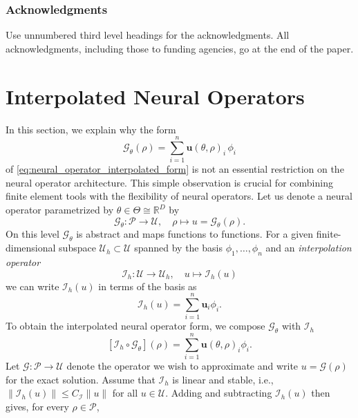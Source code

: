 \documentclass{article} %
\begin{document}
\subsubsection*{Acknowledgments}
Use unnumbered third level headings for the acknowledgments. All
acknowledgments, including those to funding agencies, go at the end of the paper.





\appendix

\section{Interpolated Neural Operators}
In this section, we explain why the form
\begin{equation*}
   \mathcal G_\theta(\rho) 
   =
   \sum_{i=1}^n\mathbf u(\theta, \rho)_i\,\phi_i
\end{equation*}
of \eqref{eq:neural_operator_interpolated_form} is not an essential restriction on the neural operator architecture. This simple observation is crucial for combining finite element tools with the flexibility of neural operators. Let us denote a neural operator parametrized by $\theta\in\Theta\cong \mathbb R^D$ by
\begin{equation*}
   \mathcal G_\theta:\mathcal P \to \mathcal U, \quad \rho \mapsto u = \mathcal G_\theta(\rho).
\end{equation*}
On this level $\mathcal G_\theta$ is abstract and maps functions to functions. For a given finite-dimensional subspace $\mathcal U_h\subset \mathcal U$ spanned by the basis $\phi_1,\dots,\phi_n$ and an \emph{interpolation operator}
\begin{equation*}
   \mathcal I_h : \mathcal U \to \mathcal U_h, \quad u\mapsto \mathcal I_h(u)
\end{equation*}
we can write $\mathcal I_h(u)$ in terms of the basis as
\begin{equation*}
   \mathcal I_h(u)
   =
   \sum_{i=1}^n \mathbf u_i\phi_i.
\end{equation*}
To obtain the interpolated neural operator form, we compose $\mathcal G_\theta$ with $\mathcal I_h$
\begin{equation}\label{eq:appendix_interpolated_form}
   [\mathcal I_h \circ \mathcal G_\theta](\rho)
   =
   \sum_{i=1}^n \mathbf u(\theta, \rho)_i \phi_i.
\end{equation}
Let $\mathcal G:\mathcal P\to\mathcal U$ denote the operator we wish to approximate and write $u = \mathcal G(\rho)$ for the exact solution. Assume that $\mathcal I_h$ is linear and stable, i.e., $\|\mathcal I_h(u)\|\leq C_{\mathcal I}\|u\|$ for all $u\in\mathcal U$. Adding and subtracting $\mathcal I_h(u)$ then gives, for every $\rho\in\mathcal P$,
\end{document}
